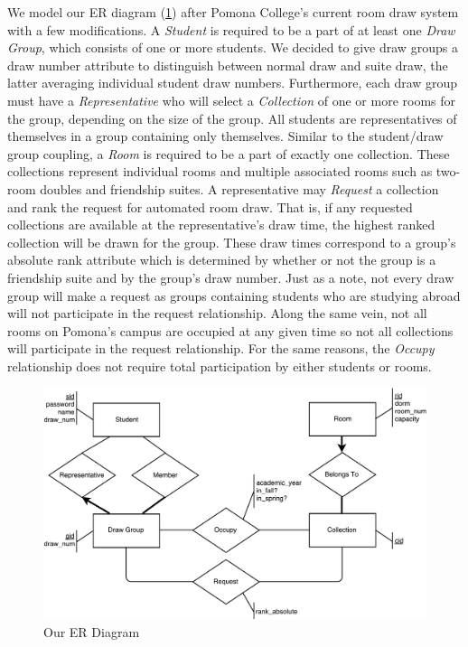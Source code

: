 We model our ER diagram (\cref{fig:er-diagram}) after Pomona College's current
room draw system with a few modifications. A \emph{Student} is required to be
a part of at least one \emph{Draw Group}, which consists of one or more
students. We decided to give draw groups a draw number attribute to distinguish
between normal draw and suite draw, the latter averaging individual student draw
numbers. Furthermore, each draw group must have a \emph{Representative} who
will select a \emph{Collection} of one or more rooms for the group, depending
on the size of the group. All students are representatives of themselves in a
group containing only themselves. Similar to the student/draw group coupling, a
\emph{Room} is required to be a part of exactly one collection. These
collections represent individual rooms and multiple associated rooms such as
two-room doubles and friendship suites. A representative may \emph{Request} a
collection and rank the request for automated room draw. That is, if any
requested collections are available at the representative's draw time, the
highest ranked collection will be drawn for the group. These draw times
correspond to a group's absolute rank attribute which is determined by whether
or not the group is a friendship suite and by the group's draw number. Just as a
note, not every draw group will make a request as groups containing students who
are studying abroad will not participate in the request relationship. Along the
same vein, not all rooms on Pomona's campus are occupied at any given time so
not all collections will participate in the request relationship. For the same
reasons, the \emph{Occupy} relationship does not require total participation
by either students or rooms.

\begin{figure}[H] \centering
\includegraphics[width=\textwidth]{er_crop.pdf}
\caption{Our ER Diagram}
\label{fig:er-diagram}
\end{figure}

